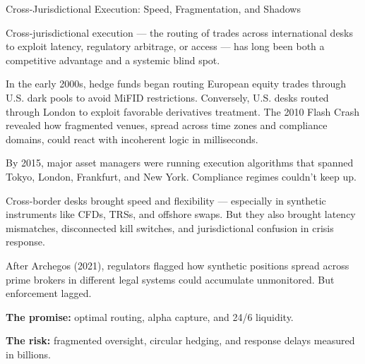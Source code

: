 \begin{HistoricalSidebar}{Cross-Jurisdictional Execution: Speed, Fragmentation, and Shadows}

  Cross-jurisdictional execution — the routing of trades across international desks to exploit 
  latency, regulatory 
  arbitrage, or access — has long been both a competitive advantage and a systemic blind spot.

  \medskip
  
  In the early 2000s, hedge funds began routing European equity trades through U.S. dark pools 
  to avoid MiFID 
  restrictions. Conversely, U.S. desks routed through London to exploit favorable derivatives 
  treatment. The 2010 
  Flash Crash revealed how fragmented venues, spread across time zones and compliance domains, 
  could react with 
  incoherent logic in milliseconds.

  \medskip
  
  By 2015, major asset managers were running execution algorithms that spanned Tokyo, London, 
  Frankfurt, and New 
  York. Compliance regimes couldn’t keep up.

  \medskip
  
  Cross-border desks brought speed and flexibility — especially in synthetic instruments like 
  CFDs, TRSs, and 
  offshore swaps. But they also brought latency mismatches, disconnected kill switches, and 
  jurisdictional confusion 
  in crisis response.

  \medskip
  
  After Archegos (2021), regulators flagged how synthetic positions spread across prime brokers in 
  different legal 
  systems could accumulate unmonitored. But enforcement lagged.

  \medskip
  
  \textbf{The promise:} optimal routing, alpha capture, and 24/6 liquidity.

  \medskip

  \textbf{The risk:} fragmented oversight, circular hedging, and response delays measured in billions.
  
\end{HistoricalSidebar}

\medskip


